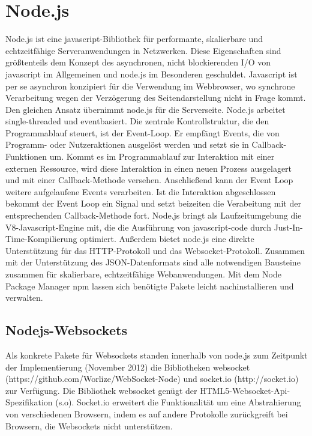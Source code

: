 \section{Node.js}\label{Node.js}
Node.js ist eine javascript-Bibliothek für performante, skalierbare und echtzeitfähige Serveranwendungen in Netzwerken. Diese Eigenschaften sind größtenteils dem Konzept des asynchronen, nicht blockierenden I/O von javascript im Allgemeinen und node.js im Besonderen geschuldet.
Javascript ist per se asynchron konzipiert für die Verwendung im Webbrowser, wo synchrone Verarbeitung wegen der Verzögerung des Seitendarstellung nicht in Frage kommt. Den gleichen Ansatz übernimmt node.js für die Serverseite.
Node.js arbeitet single-threaded und eventbasiert. Die zentrale Kontrollstruktur, die den Programmablauf steuert, ist der Event-Loop. Er empfängt Events, die von Programm- oder Nutzeraktionen ausgelöst werden und setzt sie in Callback-Funktionen um.
Kommt es im Programmablauf zur Interaktion mit einer externen Ressource, wird diese Interaktion in einen neuen Prozess ausgelagert und mit einer Callback-Methode versehen. Anschließend kann der Event Loop weitere aufgelaufene Events verarbeiten. Ist die Interaktion abgeschlossen bekommt der Event Loop ein Signal und setzt beizeiten die Verabeitung mit der entsprechenden Callback-Methode  fort.
Node.js bringt als Laufzeitumgebung die V8-Javascript-Engine mit, die die Ausführung von javascript-code durch Just-In-Time-Kompilierung optimiert. Außerdem bietet node.js eine direkte Unterstützung für das HTTP-Protokoll und das Websocket-Protokoll. Zusammen mit der Unterstützung des JSON-Datenformats sind alle notwendigen Bausteine zusammen für skalierbare, echtzeitfähige Webanwendungen.
Mit dem Node Package Manager npm lassen sich benötigte Pakete leicht nachinstallieren und verwalten.

\subsection{Nodejs-Websockets}\label{s.Nodejs-Websockets}
Als konkrete Pakete für Websockets standen innerhalb von node.js zum Zeitpunkt der Implementierung (November 2012) die Bibliotheken websocket (https://github.com/Worlize/WebSocket-Node) und socket.io (http://socket.io) zur Verfügung. Die Bibliothek websocket genügt der HTML5-Websocket-Api-Spezifikation (s.o). Socket.io erweitert die Funktionalität um eine Abstrahierung von verschiedenen Browsern, indem es auf andere Protokolle zurückgreift bei Browsern, die Websockets nicht unterstützen.


